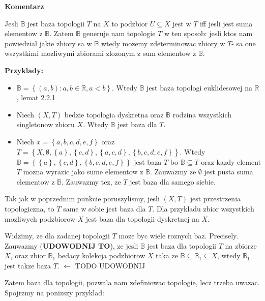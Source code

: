 \documentclass{article}
\begin{document}
\textbf{Komentarz}

Jesli $\mathbb{B}$ jest baza topologii $T$ na $X$ to podzbior $U \subseteq X$ jest w $T$ iff jesli jest suma elementow z $\mathbb{B}$. Zatem $\mathbb{B}$ generuje nam topologie $T$ w ten sposob: jesli ktos nam powiedzial jakie zbiory sa w $\mathbb{B}$ wtedy mozemy zdeterminowac zbiory w $T$- sa one wszystkimi mozliwymi zbiorami zlozonym z sum elementow z $\mathbb{B}$.

\textbf{Przyklady:}
\begin{itemize}
    \item $\mathbb{B} = \left\{ (a,b): a,b \in \mathbb{R}, a<b \right\}$. Wtedy $\mathbb{B}$ jest baza topologi euklidesowej na $\mathbb{R}$, lemat 2.2.1
    \item Niech $(X,T)$ bedzie topologia dyskretna oraz $\mathbb{B}$ rodzina wszystkich singletonow zbioru $X$. Wtedy $\mathbb{B}$ jest baza dla $T$.
    \item Niech $x = \left\{ a,b,c,d,e,f \right\}$ oraz $T = \left\{ X, \emptyset, \left\{ a \right\}, \left\{ c,d \right\}, \left\{ a,c,d \right\}, \left\{ b,c,d,e,f \right\}   \right\}$. Wtedy $\mathbb{B} = \left\{ \left\{ a \right\}, \left\{ c,d \right\}, \left\{ b,c,d,e,f \right\}  \right\}$ jest baza $T$ bo $\mathbb{B} \subseteq T$ oraz kazdy element $T$ mozna wyrazic jako sume elementow z $\mathbb{B}$. Zauwazmy ze $\emptyset$ jest pusta suma elementow z $\mathbb{B}$. Zauwazmy tez, ze $T$ jest baza dla samego siebie.
\end{itemize}

\begin{tcolorbox}[colback=white!90!green,colframe=black!35!green,title=2.2.6 Lematokomentarz: Rozne bazy dla tej samej topologii]

    Tak jak w poprzednim punkcie poruszylismy, jesli $(X,T)$ jest przestrzenia topologiczna, to $T$ same w sobie jest baza dla $T$. Dla przykladu zbior wszystkich mozliwych podzbiorow $X$ jest baza dla topologii dyskretnej na $X$.

    Widzimy, ze dla zadanej topologii $T$ moze byc wiele roznych baz. Precisely. Zauwazmy (\textbf{UDOWODNIJ TO}), ze jesli $\mathbb{B}$ jest baza dla topologii $T$ na zbiorze $X$, oraz zbior $\mathbb{B}_{1}$ bedacy kolekcja podzbiorow $X$ taka ze $\mathbb{B} \subseteq \mathbb{B}_{1} \subseteq X$, wtedy $\mathbb{B}_{1}$ jest takze baza $T$. $\leftarrow$ TODO UDOWODNIJ

\end{tcolorbox}
Zatem baza dla topologii, pozwala nam zdefiniowac topologie, lecz trzeba uwazac. Spojrzmy na ponizszy przyklad:
\end{document}
